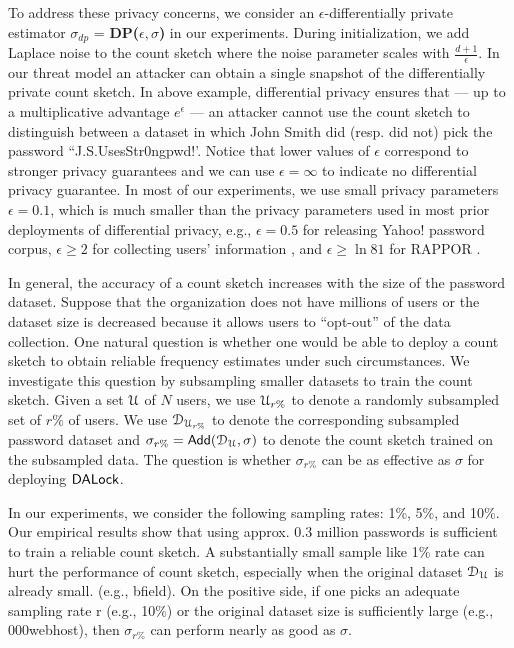 To address these privacy concerns, we consider an $\epsilon$-differentially private estimator $\sigma_{dp}$ = \textbf{DP($\epsilon,\sigma$)} in our experiments. During initialization, we add Laplace noise to the count sketch where the noise parameter scales with {$\frac{d+1}{\epsilon}$}. {In our threat model an attacker can obtain a single snapshot of the differentially private count sketch.} In above example, differential privacy ensures that --- up to a multiplicative advantage $e^{\epsilon}$ --- an attacker cannot use the count sketch to distinguish between a dataset in which John Smith did (resp. did not) pick the password ``J.S.UsesStr0ngpwd!'. Notice that lower values of $\epsilon$ correspond to stronger privacy guarantees and we can use $\epsilon=\infty$ to indicate no differential privacy guarantee. In most of our experiments, we use small privacy parameters $\epsilon=0.1$, which is much smaller than the privacy parameters used in most prior deployments of differential privacy, e.g., $\epsilon = 0.5$ for releasing Yahoo! password corpus\cite{NDSS:BloDatBon16}, $\epsilon \ge 2$ for collecting users' information \cite{AppleDPTeam}, and $\epsilon \ge  \ln{81}$ for RAPPOR \cite{CCS:ErlPihKor14,USENIX:WBLJ17}. 



 In general, the accuracy of a count sketch increases with the size of the password dataset. Suppose that the organization does not have millions of users or the dataset size is decreased because it allows users to ``opt-out” of the data collection. One natural question is whether one would be able to deploy a count sketch to obtain reliable frequency estimates under such circumstances. We investigate this question by subsampling smaller datasets to train the count sketch. Given a set $\mathcal{U}$ of $N$ users, we use $\mathcal{U}_{r\%}$ to denote a randomly subsampled set of $r\%$ of users. We use $\mathcal{D}_{{\mathcal{U}_{r\%}}}$ to denote the corresponding subsampled password dataset and $\sigma_{r\%} = \mathsf{Add}(\mathcal{D}_{{\mathcal{U}}},\sigma) $ to denote the count sketch trained on the subsampled data. The question is whether $\sigma_{r\%}$ can be as effective as $\sigma$ for deploying $\mathsf{DALock}$. 




In our experiments, we consider the following sampling rates: 1\%, 5\%, and 10\%. Our empirical results show that using approx. 0.3 million passwords is sufficient to train a reliable count sketch. A substantially small sample like 1\% rate can hurt the performance of count sketch, especially when the original dataset $\mathcal{D}_{{\mathcal{U}}}$ is already small. (e.g., bfield). On the positive side, if one picks an adequate sampling rate r (e.g., 10\%) or the original dataset size is sufficiently large (e.g., 000webhost), then $\sigma_{r\%}$ can perform nearly as good as $\sigma$.





